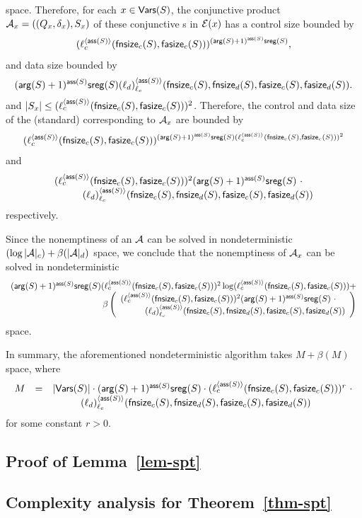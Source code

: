 \noindent space. 
Therefore, for each $x \in \mathsf{Vars}(S)$, the conjunctive product \SA{} $\mathcal{A}_x=((Q_x, \delta_x), S_x)$ of these conjunctive \SA{}s  in $\mathcal{E}(x)$ has a control size bounded by 
%
$$(\ell^{\langle \mathsf{ass}(S) \rangle}_c(\mathsf{fnsize}_c(S), \mathsf{fasize}_c(S)))^{(\mathsf{arg}(S)+1)^{\mathsf{ass}(S)} \mathsf{sreg}(S)},$$
%
and data size bounded by
%
\[ (\mathsf{arg}(S)+1)^{\mathsf{ass}(S)} \mathsf{sreg}(S) (\ell_d)^{\langle  \mathsf{ass}(S) \rangle}_{\ell_c}(\mathsf{fnsize}_c(S),\mathsf{fnsize}_d(S),  \mathsf{fasize}_c(S), \mathsf{fasize}_d(S)).\]
%
and $|S_x| \le (\ell_c^{\langle \mathsf{ass}(S) \rangle}(\mathsf{fnsize}_c(S), \mathsf{fasize}_c(S)))^2$. 
Therefore, the control and data size of the (standard) \SA{} corresponding to $\mathcal{A}_x$ are  bounded by 
%
$$(\ell^{\langle \mathsf{ass}(S) \rangle}_c(\mathsf{fnsize}_c(S), \mathsf{fasize}_c(S)))^{(\mathsf{arg}(S)+1)^{\mathsf{ass}(S)} \mathsf{sreg}(S) (\ell_c^{\langle \mathsf{ass}(S) \rangle}(\mathsf{fnsize}_c(S), \mathsf{fasize}_c(S)))^2}$$
%
and
$$
\begin{array}{l}
(\ell_c^{\langle \mathsf{ass}(S) \rangle}(\mathsf{fnsize}_c(S), \mathsf{fasize}_c(S)))^2 (\mathsf{arg}(S)+1)^{\mathsf{ass}(S)} \mathsf{sreg}(S)\ \cdot  \\
\hspace{1cm}(\ell_d)^{\langle  \mathsf{ass}(S) \rangle}_{\ell_c}(\mathsf{fnsize}_c(S),\mathsf{fnsize}_d(S),  \mathsf{fasize}_c(S), \mathsf{fasize}_d(S))
\end{array}
$$
respectively.

Since the nonemptiness of an \SA{} $\mathcal{A}$ can be solved in nondeterministic $(\log |\mathcal{A}|_c) + \beta(|\mathcal{A}|_d)$ space, we conclude that the nonemptiness of $\mathcal{A}_x$ can be solved in nondeterministic 
{\small
$$
\begin{array}{l}
(\rcdim(S)+1)^{\rcdep(S)} \rcsreg(S) (\ell_c^{\langle \rcdep(S) \rangle}(\rcphi_c(S), \rcpsi_c(S)))^2 \log (\ell^{\langle \rcdep(S) \rangle}_c(\rcphi_c(S), \rcpsi_c(S)))+ \\
\hfill \beta
\left(
\begin{array}{l}
(\ell_c^{\langle \rcdep(S) \rangle}(\rcphi_c(S), \rcpsi_c(S)))^2 (\rcdim(S)+1)^{\rcdep(S)} \rcsreg(S)\ \cdot  \\
\hspace{1cm} (\ell_d)^{\langle  \rcdep(S) \rangle}_{\ell_c}(\rcphi_c(S),\rcphi_d(S),  \rcpsi_c(S), \rcpsi_d(S))
\end{array}
\right)
\end{array}
$$
}
space.

In summary, the aforementioned nondeterministic algorithm takes  $M + \beta(M)$ space, where 
%
$$
\begin{array}{l c l}
M & = & |\mathsf{Vars}(S)| \cdot (\mathsf{arg}(S)+1)^{\mathsf{ass}(S)}  \mathsf{sreg}(S) \cdot  (\ell_c^{\langle \mathsf{ass}(S) \rangle}(\mathsf{fnsize}_c(S), \mathsf{fasize}_c(S)))^{r}\ \cdot \\
& &  \hspace{1cm} (\ell_d)^{\langle  \mathsf{ass}(S) \rangle}_{\ell_c}(\mathsf{fnsize}_c(S),\mathsf{fnsize}_d(S),  \mathsf{fasize}_c(S), \mathsf{fasize}_d(S))
\end{array}
$$
%
for some constant $r > 0$.



\subsection{Proof of Lemma~\ref{lem-spt}}


\subsection{Complexity analysis for Theorem~\ref{thm-spt}}